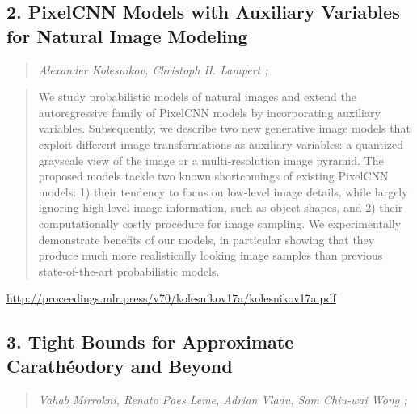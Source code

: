 \documentclass{article}
\begin{document}
\subsection{2. PixelCNN Models with Auxiliary Variables for Natural Image Modeling}

\begin{quote}
\footnotesize{\textit{Alexander Kolesnikov, Christoph H. Lampert ;}}
\end{quote}

\begin{quote}
    We study probabilistic models of natural images and extend the autoregressive family of PixelCNN models by incorporating auxiliary variables. Subsequently, we describe two new generative image models that exploit different image transformations as auxiliary variables: a quantized grayscale view of the image or a multi-resolution image pyramid. The proposed models tackle two known shortcomings of existing PixelCNN models: 1) their tendency to focus on low-level image details, while largely ignoring high-level image information, such as object shapes, and 2) their computationally costly procedure for image sampling. We experimentally demonstrate benefits of our models, in particular showing that they produce much more realistically looking image samples than previous state-of-the-art probabilistic models.  \end{quote}

\href{http://proceedings.mlr.press/v70/kolesnikov17a/kolesnikov17a.pdf}{http://proceedings.mlr.press/v70/kolesnikov17a/kolesnikov17a.pdf}

\subsection{3. Tight Bounds for Approximate Carathéodory and Beyond}

\begin{quote}
\footnotesize{\textit{Vahab Mirrokni, Renato Paes Leme, Adrian Vladu, Sam Chiu-wai Wong ;}}
\end{quote}
\end{document}
